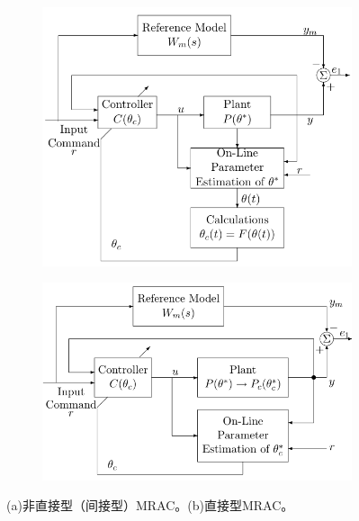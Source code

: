 \begin{figure}[htbp]
  \centering
  \begin{subfigure}{0.45\textwidth}
    \includegraphics[width=1\linewidth]{figure/adaptive/indirect_MRAC.png} %
    \caption{}
\end{subfigure}
  \begin{subfigure}{0.45\textwidth}
    \includegraphics[width=1\linewidth]{figure/adaptive/direct_MRAC.png} %
    \caption{}
\end{subfigure}
\caption{(a)非直接型（间接型）MRAC。(b)直接型MRAC。}
\end{figure}